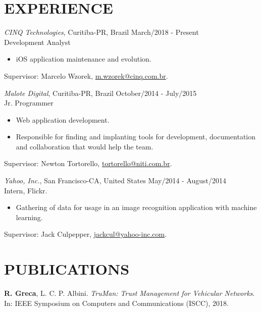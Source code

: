 \documentclass[margin]{res}
\begin{document}
\begin{resume}
 		\section{EXPERIENCE}
 			{\sl CINQ Technologies}, Curitiba-PR, Brazil \hfill March/2018 - Present \\
 			Development Analyst
 			\begin{itemize}
				\itemsep -2pt
		    	\item iOS application maintenance and evolution.
			\end{itemize}
			Supervisor: Marcelo Wzorek, \href{mailto:m.wzorek@cinq.com.br}{m.wzorek@cinq.com.br}.
 		
			{\sl Malote Digital}, Curitiba-PR, Brazil \hfill October/2014 - July/2015 \\
			Jr. Programmer
			\begin{itemize}
				\itemsep -2pt
		    	\item Web application development.
				\item Responsible for finding and implanting tools for development, documentation and collaboration that would help the team.
			\end{itemize}
			Supervisor: Newton Tortorello, \href{mailto:tortorello@niti.com.br}{tortorello@niti.com.br}.
			
			{\sl Yahoo, Inc.}, San Francisco-CA, United States \hfill May/2014 - August/2014 \\
			Intern, Flickr.
			\begin{itemize}
				\itemsep -2pt
		    	\item Gathering of data for usage in an image recognition application with machine learning.
			\end{itemize}
			Supervisor: Jack Culpepper, \href{mailto:jackcul@yahoo-inc.com}{jackcul@yahoo-inc.com}.


		\section{PUBLICATIONS}
			\textbf{R. Greca}, L. C. P. Albini. {\sl TruMan: Trust Management for Vehicular Networks}. In: IEEE Symposium on Computers and Communications (ISCC), 2018.
	

\end{resume}
\end{document}
